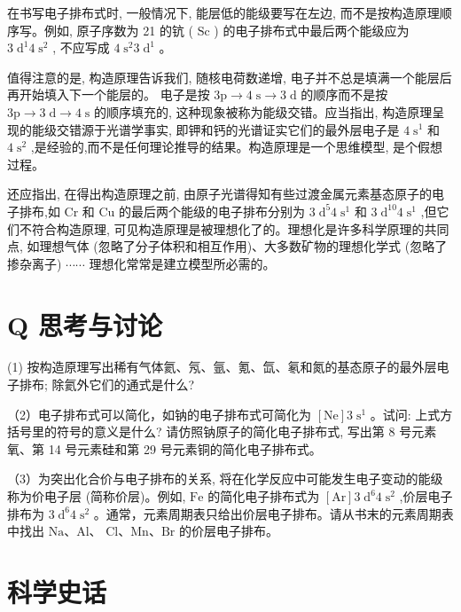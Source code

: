 \documentclass[10pt]{article}
\begin{document}
在书写电子排布式时, 一般情况下, 能层低的能级要写在左边, 而不是按构造原理顺序写。例如, 原子序数为 21 的钪 ( \(\mathrm{{Sc}}\) ) 的电子排布式中最后两个能级应为 \(3{\mathrm{\;d}}^{1}4{\mathrm{\;s}}^{2}\) , 不应写成 \(4{\mathrm{\;s}}^{2}3{\mathrm{\;d}}^{1}\) 。

值得注意的是, 构造原理告诉我们, 随核电荷数递增, 电子并不总是填满一个能层后再开始填入下一个能层的。 电子是按 \(3\mathrm{p} \rightarrow 4\mathrm{\;s} \rightarrow 3\mathrm{\;d}\) 的顺序而不是按 \(3\mathrm{p} \rightarrow 3\mathrm{\;d} \rightarrow 4\mathrm{\;s}\) 的顺序填充的, 这种现象被称为能级交错。应当指出, 构造原理呈现的能级交错源于光谱学事实, 即钾和钙的光谱证实它们的最外层电子是 \(4{\mathrm{\;s}}^{1}\) 和 \(4{\mathrm{\;s}}^{2}\) ,是经验的,而不是任何理论推导的结果。构造原理是一个思维模型, 是个假想过程。

还应指出, 在得出构造原理之前, 由原子光谱得知有些过渡金属元素基态原子的电子排布,如 \(\mathrm{{Cr}}\) 和 \(\mathrm{{Cu}}\) 的最后两个能级的电子排布分别为 \(3{\mathrm{\;d}}^{5}4{\mathrm{\;s}}^{1}\) 和 \(3{\mathrm{\;d}}^{10}4{\mathrm{\;s}}^{1}\) ,但它们不符合构造原理, 可见构造原理是被理想化了的。理想化是许多科学原理的共同点, 如理想气体 (忽略了分子体积和相互作用)、大多数矿物的理想化学式 (忽略了掺杂离子) \(\cdots \cdots\) 理想化常常是建立模型所必需的。

\section*{Q 思考与讨论}

(1) 按构造原理写出稀有气体氦、氖、氩、氪、氙、氡和氮的基态原子的最外层电子排布; 除氦外它们的通式是什么?

（2）电子排布式可以简化，如钠的电子排布式可简化为 \(\left\lbrack \mathrm{{Ne}}\right\rbrack 3{\mathrm{\;s}}^{1}\) 。试问: 上式方括号里的符号的意义是什么? 请仿照钠原子的简化电子排布式, 写出第 8 号元素氧、第 14 号元素硅和第 29 号元素铜的简化电子排布式。

（3）为突出化合价与电子排布的关系, 将在化学反应中可能发生电子变动的能级称为价电子层 (简称价层)。例如, \(\mathrm{{Fe}}\) 的简化电子排布式为 \(\left\lbrack \mathrm{{Ar}}\right\rbrack 3{\mathrm{\;d}}^{6}4{\mathrm{\;s}}^{2}\) ,价层电子排布为 \(3{\mathrm{\;d}}^{6}4{\mathrm{\;s}}^{2}\) 。通常，元素周期表只给出价层电子排布。请从书末的元素周期表中找出 \(\mathrm{{Na}}\text{、}\mathrm{{Al}}\text{、}\) \(\mathrm{{Cl}}\text{、}\mathrm{{Mn}}\text{、}\mathrm{{Br}}\) 的价层电子排布。

\section*{科学史话}
\end{document}

